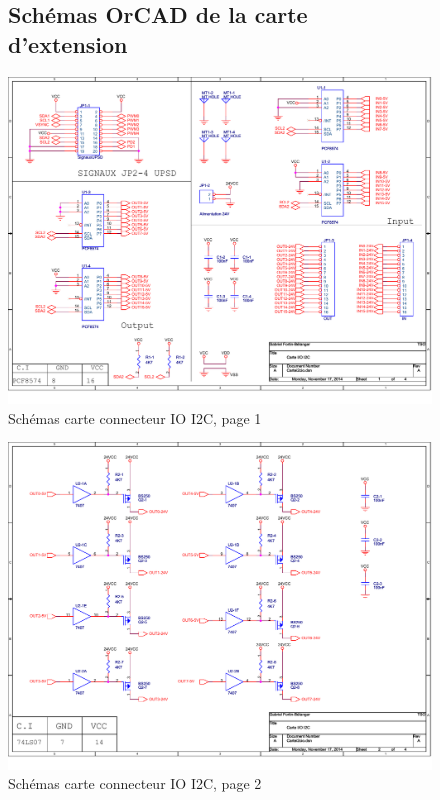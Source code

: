 
\begin{figure}[hbtp]
\subsection{Schémas OrCAD de la carte d'extension}
\caption{Schémas carte connecteur IO I2C, page 1}
\centering
\includegraphics[scale=0.87,angle=90]{Figures/OrCad/PAGE1.pdf}
\end{figure}

\begin{figure}[hbtp]
\caption{Schémas carte connecteur IO I2C, page 2}
\centering
\includegraphics[scale=0.87,angle=90]{Figures/OrCad/PAGE2.pdf}
\end{figure}

